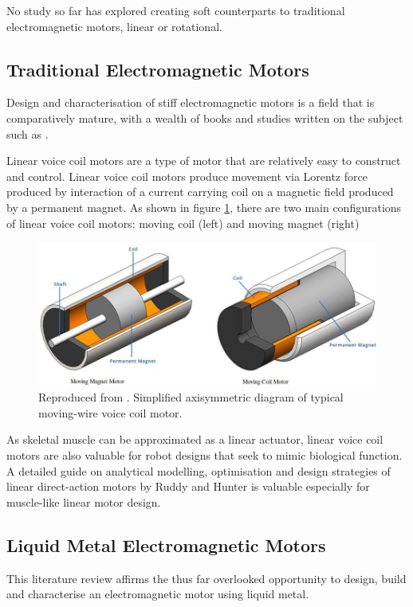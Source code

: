 \documentclass[a4paper,12pt]{article}
\begin{document}
No study so far has explored creating soft counterparts to traditional electromagnetic motors, linear or rotational.

\subsection{Traditional Electromagnetic Motors}
Design and characterisation of stiff electromagnetic motors is a field that is comparatively mature, with a wealth of books and studies written on the subject such as \cite{moritzElectromechanicalMotionSystems2013}.

Linear voice coil motors are a type of motor that are relatively easy to construct and control. Linear voice coil motors produce movement via Lorentz force produced by interaction of a current carrying coil on a magnetic field produced by a permanent magnet. As shown in figure \ref{fg:coilmotor}, there are two main configurations of linear voice coil motors: moving coil (left) and moving magnet (right)

\begin{figure}[h!]
    \centering
    \includegraphics[width=\textwidth]{motorDiagram.jpg}
    \caption{Reproduced from \cite{h2wtechnologiesWhatVoiceCoil2018}. Simplified axisymmetric diagram of typical moving-wire voice coil motor.}
    \label{fg:coilmotor}
\end{figure}

As skeletal muscle can be approximated as a linear actuator, linear voice coil motors are also valuable for robot designs that seek to mimic biological function. A detailed guide on analytical modelling, optimisation and design strategies of linear direct-action motors by Ruddy and Hunter \cite{ruddyDesignOptimizationStrategies2011} is valuable especially for muscle-like linear motor design.

\subsection{Liquid Metal Electromagnetic Motors}
This literature review affirms the thus far overlooked opportunity to design, build and characterise an electromagnetic motor using liquid metal.
\end{document}

